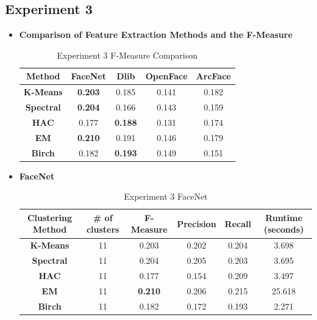\documentclass[12pt,english]{article}
\begin{document}
\subsection{Experiment 3}
\begin{itemize}
\item \textbf{Comparison of Feature Extraction Methods and the F-Measure}
\begin{table}[H]
\centering
\begin{tabular}{||c c c c c||} 
 \hline
Method & FaceNet & Dlib & OpenFace & ArcFace\\ [0.5ex]
 \hline\hline
 \textbf{K-Means} & \textbf{0.203} & 0.185 & 0.141 & 0.182\\ 
 \hline
  \textbf{Spectral} & \textbf{0.204} & 0.166 & 0.143 & 0.159\\
 \hline
 \textbf{HAC} & 0.177 & \textbf{0.188} & 0.131 & 0.174\\
 \hline
 \textbf{EM} & \textbf{0.210} & 0.191 & 0.146 & 0.179\\
 \hline
 \textbf{Birch} & 0.182 & \textbf{0.193} & 0.149 & 0.151\\
 \hline
\end{tabular}
\caption{Experiment 3 F-Measure Comparison}
\label{table:ex3}
\end{table}

\item \textbf{FaceNet}
\begin{table}[H]
\centering
\begin{tabular}{||c c c c c c||} 
 \hline
 Clustering Method & \# of clusters & F-Measure & Precision & Recall & Runtime (seconds)\\ [0.5ex]
 \hline\hline
 \textbf{K-Means} & 11 & 0.203 & 0.202 & 0.204 & 3.698\\ 
 \hline
  \textbf{Spectral} & 11 & 0.204 & 0.205 & 0.203 & 3.695\\
 \hline
 \textbf{HAC} & 11 & 0.177 & 0.154 & 0.209 & 3.497\\
 \hline
 \textbf{EM} & 11 & \textbf{0.210} & 0.206 & 0.215 & 25.618\\
 \hline
 \textbf{Birch} & 11 & 0.182 & 0.172 & 0.193 & 2.271\\
 \hline
\end{tabular}
\caption{Experiment 3 FaceNet}
\label{table:ex3facenet}
\end{table}


\end{itemize}
\end{document}
